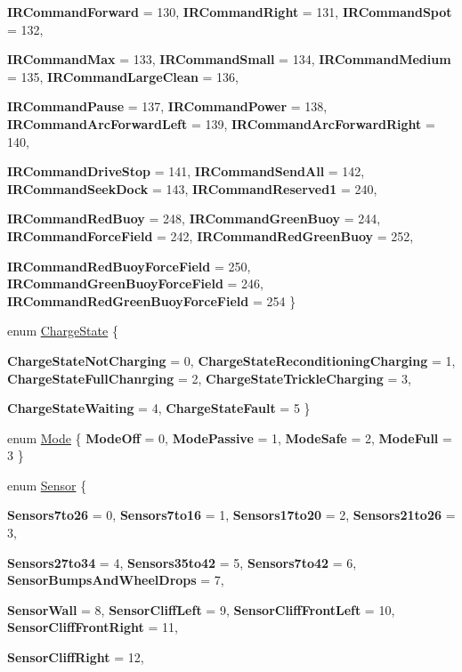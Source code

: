 \begin{DoxyCompactItemize}
{\bfseries IRCommandForward} =  130, 
{\bfseries IRCommandRight} =  131, 
{\bfseries IRCommandSpot} =  132, 
\par
{\bfseries IRCommandMax} =  133, 
{\bfseries IRCommandSmall} =  134, 
{\bfseries IRCommandMedium} =  135, 
{\bfseries IRCommandLargeClean} =  136, 
\par
{\bfseries IRCommandPause} =  137, 
{\bfseries IRCommandPower} =  138, 
{\bfseries IRCommandArcForwardLeft} =  139, 
{\bfseries IRCommandArcForwardRight} =  140, 
\par
{\bfseries IRCommandDriveStop} =  141, 
{\bfseries IRCommandSendAll} =  142, 
{\bfseries IRCommandSeekDock} =  143, 
{\bfseries IRCommandReserved1} =  240, 
\par
{\bfseries IRCommandRedBuoy} =  248, 
{\bfseries IRCommandGreenBuoy} =  244, 
{\bfseries IRCommandForceField} =  242, 
{\bfseries IRCommandRedGreenBuoy} =  252, 
\par
{\bfseries IRCommandRedBuoyForceField} =  250, 
{\bfseries IRCommandGreenBuoyForceField} =  246, 
{\bfseries IRCommandRedGreenBuoyForceField} =  254
 \}
\item 
enum \hyperlink{namespaceroomba_masks_ad2fb0f1f3ca9679388699bd02a12314b}{ChargeState} \{ \par
{\bfseries ChargeStateNotCharging} =  0, 
{\bfseries ChargeStateReconditioningCharging} =  1, 
{\bfseries ChargeStateFullChanrging} =  2, 
{\bfseries ChargeStateTrickleCharging} =  3, 
\par
{\bfseries ChargeStateWaiting} =  4, 
{\bfseries ChargeStateFault} =  5
 \}
\item 
enum \hyperlink{namespaceroomba_masks_a649d73395e98d80b35b5fbfeb2c276c2}{Mode} \{ {\bfseries ModeOff} =  0, 
{\bfseries ModePassive} =  1, 
{\bfseries ModeSafe} =  2, 
{\bfseries ModeFull} =  3
 \}
\item 
enum \hyperlink{namespaceroomba_masks_af50727ed54927015c0a31955a3fb2c4c}{Sensor} \{ \par
{\bfseries Sensors7to26} =  0, 
{\bfseries Sensors7to16} =  1, 
{\bfseries Sensors17to20} =  2, 
{\bfseries Sensors21to26} =  3, 
\par
{\bfseries Sensors27to34} =  4, 
{\bfseries Sensors35to42} =  5, 
{\bfseries Sensors7to42} =  6, 
{\bfseries SensorBumpsAndWheelDrops} =  7, 
\par
{\bfseries SensorWall} =  8, 
{\bfseries SensorCliffLeft} =  9, 
{\bfseries SensorCliffFrontLeft} =  10, 
{\bfseries SensorCliffFrontRight} =  11, 
\par
{\bfseries SensorCliffRight} =  12, 

\end{DoxyCompactItemize}
